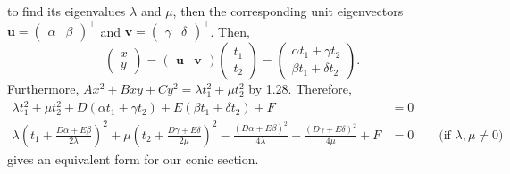 to find its eigenvalues \(\lambda\) and \(\mu\), then the corresponding unit eigenvectors \(\mathbf{u}=
\begin{pmatrix}
    \alpha & \beta
\end{pmatrix}^\top\) and \(\mathbf{v}=
\begin{pmatrix}
    \gamma & \delta
\end{pmatrix}^\top\). Then,
\[\begin{pmatrix}
    x\\
    y
\end{pmatrix}=
\begin{pmatrix}
    \mathbf{u} & \mathbf{v}
\end{pmatrix}
\begin{pmatrix}
    t_1\\
    t_2
\end{pmatrix}=
\begin{pmatrix}
    \alpha t_1+\gamma t_2\\
    \beta t_1+\delta t_2
\end{pmatrix}.\]
Furthermore, \(Ax^2+Bxy+Cy^2=\lambda t_1^2+\mu t_2^2\) by \hyperlink{thm:quadratic-forms-real}{1.28}. Therefore, 
\begin{align*}
    \lambda t_1^2+\mu t_2^2+D(\alpha t_1+\gamma t_2)+E(\beta t_1+\delta t_2)+F&=0\\
    \lambda\left( t_1+\frac{D\alpha+E\beta}{2\lambda} \right)^2+\mu\left( t_2+\frac{D\gamma+E\delta}{2\mu} \right)^2-\frac{(D\alpha+E\beta)^2}{4\lambda}-\frac{(D\gamma+E\delta)^2}{4\mu}+F&=0 \qquad\text{(if \(\lambda,\mu\neq 0\))}
\end{align*}
gives an equivalent form for our conic section. 

